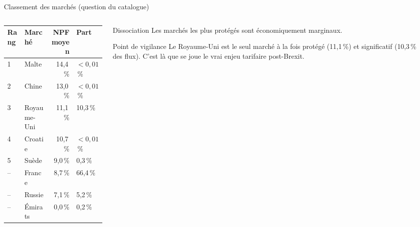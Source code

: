 \documentclass[aspectratio=169,10pt]{beamer}
\begin{document}
\begin{frame}{Classement des marchés (question du catalogue)}
  \begin{columns}[T,onlytextwidth]
    \begin{column}{0.55\textwidth}
      \centering
      \small
      \begin{tabular}{llrl}
        \toprule
        Rang & Marché & NPF moyen & Part \\
        \midrule
        1 & Malte & 14,4\,\% & $<0{,}01$\,\% \\
        2 & Chine & 13,0\,\% & $<0{,}01$\,\% \\
        3 & Royaume-Uni & 11,1\,\% & 10,3\,\% \\
        4 & Croatie & 10,7\,\% & $<0{,}01$\,\% \\
        5 & Suède & 9,0\,\% & 0,3\,\% \\
        -- & France & 8,7\,\% & 66,4\,\% \\
        -- & Russie & 7,1\,\% & 5,2\,\% \\
        -- & Émirats & 0,0\,\% & 0,2\,\% \\
        \bottomrule
      \end{tabular}
    \end{column}
    \begin{column}{0.42\textwidth}
      \begin{block}{Dissociation}
        Les marchés les plus protégés sont économiquement marginaux.
      \end{block}
      \begin{block}{Point de vigilance}
        Le Royaume-Uni est le seul marché à la fois protégé
        (11,1\,\%) et significatif (10,3\,\% des flux). C'est là que se
        joue le vrai enjeu tarifaire post-Brexit.
      \end{block}
    \end{column}
  \end{columns}
\end{frame}
\end{document}
